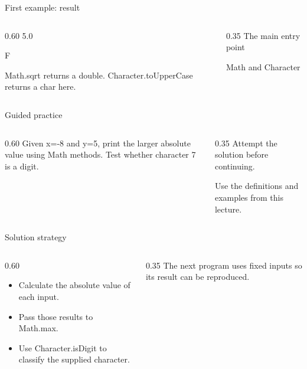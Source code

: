 \documentclass[10pt,aspectratio=169]{beamer}
\begin{document}
\begin{frame}[fragile,t]{First example: result}
\begin{columns}[T,onlytextwidth]\begin{column}{0.60\textwidth}
5.0\par F\par Math.sqrt returns a double. Character.toUpperCase returns a char here.
\end{column}\begin{column}{0.35\textwidth}\small
The main entry point

Math and Character
\end{column}\end{columns}
\end{frame}

\begin{frame}[fragile,t]{Guided practice}
\begin{columns}[T,onlytextwidth]\begin{column}{0.60\textwidth}
Given x=-8 and y=5, print the larger absolute value using Math methods. Test whether character 7 is a digit.
\end{column}\begin{column}{0.35\textwidth}\small
Attempt the solution before continuing.

Use the definitions and examples from this lecture.
\end{column}\end{columns}
\end{frame}

\begin{frame}[fragile,t]{Solution strategy}
\begin{columns}[T,onlytextwidth]\begin{column}{0.60\textwidth}
\begin{itemize}
\item Calculate the absolute value of each input.
\item Pass those results to Math.max.
\item Use Character.isDigit to classify the supplied character.
\end{itemize}
\end{column}\begin{column}{0.35\textwidth}\small
The next program uses fixed inputs so its result can be reproduced.
\end{column}\end{columns}
\end{frame}
\end{document}
